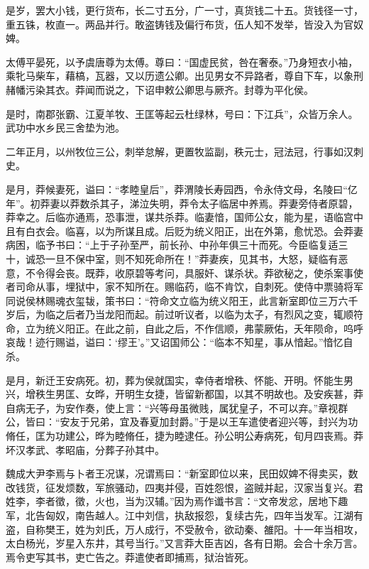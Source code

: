 \documentclass[12pt,UTF8]{ctexbook}
\begin{document}
是岁，罢大小钱，更行货布，长二寸五分，广一寸，真货钱二十五。货钱径一寸，重五铢，枚直一。两品并行。敢盗铸钱及偏行布货，伍人知不发举，皆没入为官奴婢。



太傅平晏死，以予虞唐尊为太傅。尊曰：“国虚民贫，咎在奢泰。”乃身短衣小袖，乘牝马柴车，藉槁，瓦器，又以历遗公卿。出见男女不异路者，尊自下车，以象刑赭幡污染其衣。莽闻而说之，下诏申敕公卿思与厥齐。封尊为平化侯。



是时，南郡张霸、江夏羊牧、王匡等起云杜绿林，号曰：下江兵”，众皆万余人。武功中水乡民三舍垫为池。



二年正月，以州牧位三公，刺举怠解，更置牧监副，秩元士，冠法冠，行事如汉刺史。



是月，莽候妻死，谥曰：“孝睦皇后”，莽渭陵长寿园西，令永侍文母，名陵曰“亿年”。初莽妻以莽数杀其子，涕泣失明，莽令太子临居中养焉。莽妻旁侍者原碧，莽幸之。后临亦通焉，恐事泄，谋共杀莽。临妻愔，国师公女，能为星，语临宫中且有白衣会。临喜，以为所谋且成。后贬为统义阳正，出在外第，愈忧恐。会莽妻病困，临予书曰：“上于子孙至严，前长孙、中孙年俱三十而死。今臣临复适三十，诚恐一旦不保中室，则不知死命所在！”莽妻疾，见其书，大怒，疑临有恶意，不令得会丧。既莽，收原碧等考问，具服奸、谋杀状。莽欲秘之，使杀案事使者司命从事，埋狱中，家不知所在。赐临药，临不肯饮，自刺死。使侍中票骑将军同说侯林赐魂衣玺韨，策书曰：“符命文立临为统义阳王，此言新室即位三万六千岁后，为临之后者乃当龙阳而起。前过听议者，以临为太子，有烈风之变，辄顺符命，立为统义阳正。在此之前，自此之后，不作信顺，弗蒙厥佑，夭年陨命，呜呼哀哉！迹行赐谥，谥曰：‘缪王’。”又诏国师公：“临本不知星，事从愔起。”愔忆自杀。



是月，新迁王安病死。初，葬为侯就国实，幸侍者增秩、怀能、开明。怀能生男兴，增秩生男匡、女晔，开明生女捷，皆留新都国，以其不明故也。及安疾甚，莽自病无子，为安作奏，使上言：“兴等母虽微贱，属犹皇子，不可以弃。”章视群公，皆曰：“安友于兄弟，宜及春夏加封爵。”于是以王车遣使者迎兴等，封兴为功脩任，匡为功建公，晔为睦脩任，捷为睦逮任。孙公明公寿病死，旬月四丧焉。莽坏汉孝武、孝昭庙，分葬子孙其中。



魏成大尹李焉与卜者王况谋，况谓焉曰：“新室即位以来，民田奴婢不得卖买，数改钱货，征发烦数，军旅骚动，四夷并侵，百姓怨恨，盗贼并起，汉家当复兴。君姓李，李者徵，徵，火也，当为汉辅。”因为焉作谶书言：“文帝发忿，居地下趣军，北告匈奴，南告越人。江中刘信，执敌报怨，复续古先，四年当发军。江湖有盗，自称樊王，姓为刘氏，万人成行，不受赦令，欲动秦、雒阳。十一年当相攻，太白杨光，岁星入东井，其号当行。”又言莽大臣吉凶，各有日期。会合十余万言。焉令吏写其书，吏亡告之。莽遣使者即捕焉，狱治皆死。
\end{document}
